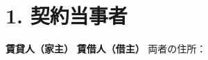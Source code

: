 \section*{1. 契約当事者}
\textbf{賃貸人（家主）}
\ContractLandlordsJA
\vspace{0.5cm}
\textbf{賃借人（借主）}
\ContractTenantsJA
両者の住所：\Propaddress

